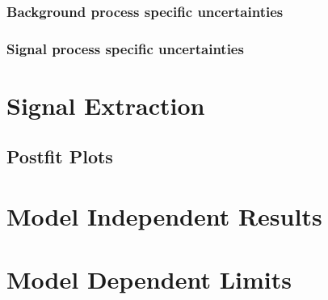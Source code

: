 \subsubsection{Background process specific uncertainties}

\subsubsection{Signal process specific uncertainties}

\section{Signal Extraction}

\subsection{Postfit Plots}
\section{Model Independent Results}
\section{Model Dependent Limits}